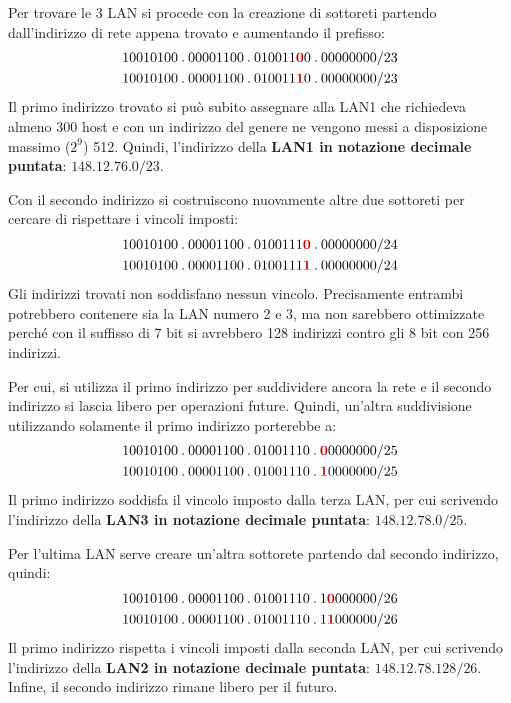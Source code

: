 \documentclass[a4paper]{article}
\newcommand{\binaryaddresspointed}[4]{#1\:.\:#2\:.\:#3\:.\:#4}
\begin{document}
	\noindent
	Per trovare le 3 LAN si procede con la creazione di sottoreti partendo dall’indirizzo di rete appena trovato e aumentando il prefisso:
	\begin{gather*}
		\binaryaddresspointed{10010100}{00001100}{010011\textcolor{Red3}{\boldsymbol{0}}0}{00000000}/23 \\
		\binaryaddresspointed{10010100}{00001100}{010011\textcolor{Red3}{\boldsymbol{1}}0}{00000000}/23
	\end{gather*}
	Il primo indirizzo trovato si può subito assegnare alla LAN1 che richiedeva almeno 300 host e con un indirizzo del genere ne vengono messi a disposizione massimo ($2^{9}$) 512. Quindi, l’indirizzo della \textbf{LAN1 in notazione decimale puntata}: $148.12.76.0/23$.\newline
	
	\noindent
	Con il secondo indirizzo si costruiscono nuovamente altre due sottoreti per cercare di rispettare i vincoli imposti:
	\begin{gather*}
		\binaryaddresspointed{10010100}{00001100}{0100111\textcolor{Red3}{\boldsymbol{0}}}{00000000}/24 \\
		\binaryaddresspointed{10010100}{00001100}{0100111\textcolor{Red3}{\boldsymbol{1}}}{00000000}/24
	\end{gather*}
	Gli indirizzi trovati non soddisfano nessun vincolo. Precisamente entrambi potrebbero contenere sia la LAN numero 2 e 3, ma non sarebbero ottimizzate perché con il suffisso di 7 bit si avrebbero 128 indirizzi contro gli 8 bit con 256 indirizzi.\newline
	
	\noindent
	Per cui, si utilizza il primo indirizzo per suddividere ancora la rete e il secondo indirizzo si lascia libero per operazioni future. Quindi, un’altra suddivisione utilizzando solamente il primo indirizzo porterebbe a:
	\begin{gather*}
		\binaryaddresspointed{10010100}{00001100}{01001110}{\textcolor{Red3}{\boldsymbol{0}}0000000}/25 \\
		\binaryaddresspointed{10010100}{00001100}{01001110}{\textcolor{Red3}{\boldsymbol{1}}0000000}/25
	\end{gather*}
	Il primo indirizzo soddisfa il vincolo imposto dalla terza LAN, per cui scrivendo l’indirizzo della \textbf{LAN3 in notazione decimale puntata}: $148.12.78.0/25$.\newline
	
	\noindent
	Per l’ultima LAN serve creare un’altra sottorete partendo dal secondo indirizzo, quindi:
	\begin{gather*}
		\binaryaddresspointed{10010100}{00001100}{01001110}{1\textcolor{Red3}{\boldsymbol{0}}000000}/26 \\
		\binaryaddresspointed{10010100}{00001100}{01001110}{1\textcolor{Red3}{\boldsymbol{1}}000000}/26
	\end{gather*}
	Il primo indirizzo rispetta i vincoli imposti dalla seconda LAN, per cui scrivendo l’indirizzo della \textbf{LAN2 in notazione decimale puntata}: $148.12.78.128/26$.\newline
	Infine, il secondo indirizzo rimane libero per il futuro.
	
\end{document}
